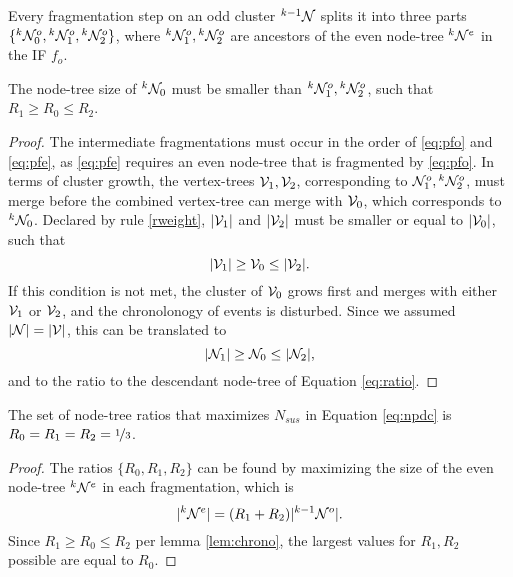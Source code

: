 Every fragmentation step on an odd cluster ${}^{k-1}\mathcal{N}$ splits it into three parts $\{{}^{k}\mathcal{N}^o_0, {}^{k}\mathcal{N}^o_1, {}^{k}\mathcal{N}^o_2\}$, where ${}^{k}\mathcal{N}^o_1, {}^{k}\mathcal{N}^o_2$ are ancestors of the even node-tree ${}^{k}\mathcal{N}^e$ in the IF $f_o$. 

\begin{lemma}\label{lem:chrono}
  The node-tree size of ${}^{k}\mathcal{N}_0$ must be smaller than ${}^{k}\mathcal{N}^o_1, {}^{k}\mathcal{N}^o_2$, such that $R_1 \geq R_0 \leq R_2$. 
\end{lemma}
\begin{proof}
  The intermediate fragmentations must occur in the order of \eqref{eq:pfo} and \eqref{eq:pfe}, as \eqref{eq:pfe} requires an even node-tree that is fragmented by \eqref{eq:pfo}. In terms of cluster growth, the vertex-trees $\mathcal{V}_1, \mathcal{V}_2$, corresponding to $\mathcal{N}^o_1, {}^{k}\mathcal{N}^o_2$, must merge before the combined vertex-tree can merge with $\mathcal{V}_0$, which corresponds to ${}^{k}\mathcal{N}_0$. Declared by rule \ref{rweight}, $\lvert\mathcal{V}_1\rvert$ and $\lvert\mathcal{V}_2\rvert$ must be smaller or equal to $\lvert\mathcal{V}_0\rvert$, such that 
  \begin{equation*}
    \lvert\mathcal{V}_1\rvert\geq \mathcal{V}_0 \leq\lvert\mathcal{V}_2\rvert.
  \end{equation*}
  If this condition is not met, the cluster of $\mathcal{V}_0$ grows first and merges with either $\mathcal{V}_1$ or $\mathcal{V}_2$, and the chronolonogy of events is disturbed. Since we assumed $\lvert\mathcal{N}\rvert=\lvert\mathcal{V}\rvert$, this can be translated to 
  \begin{equation*}
    \lvert\mathcal{N}_1\rvert\geq \mathcal{N}_0 \leq\lvert\mathcal{N}_2\rvert,
  \end{equation*}
  and to the ratio to the descendant node-tree of Equation \eqref{eq:ratio}.
\end{proof}

\begin{theorem}\label{the:ratios}
  The set of node-tree ratios that maximizes $N_{sus}$ in Equation \eqref{eq:npdc} is $R_0 = R_1 = R_2 = \nicefrac{1}{3}$.
\end{theorem}
\begin{proof}
  The ratios $\{R_0, R_1, R_2\}$ can be found by maximizing the size of the even node-tree ${}^{k}\mathcal{N}^e$ in each fragmentation, which is 
  \begin{equation*}
    \lvert{}^{k}\mathcal{N}^e\rvert = (R_1 + R_2)\lvert{}^{k-1}\mathcal{N}^o\rvert.
  \end{equation*}
  Since $ R_1 \geq R_0 \leq R_2$ per lemma \ref{lem:chrono}, the largest values for $R_1, R_2$ possible are equal to $R_0$.
\end{proof}

